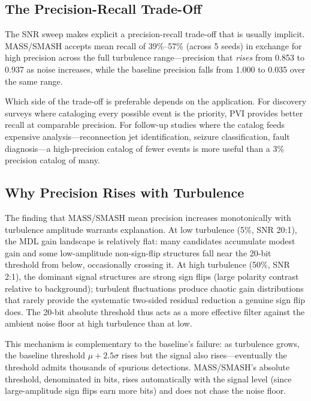 \documentclass[12pt,letterpaper]{article}
\begin{document}
\subsection{The Precision-Recall Trade-Off}

The SNR sweep makes explicit a precision-recall trade-off that is usually
implicit.
MASS/SMASH accepts mean recall of 39\%--57\% (across 5 seeds) in exchange for
high precision across the full turbulence range---precision that
\emph{rises} from 0.853 to 0.937 as noise increases, while the baseline
precision falls from 1.000 to 0.035 over the same range.

Which side of the trade-off is preferable depends on the application.
For discovery surveys where cataloging every possible event is the priority,
PVI provides better recall at comparable precision.
For follow-up studies where the catalog feeds expensive analysis---reconnection
jet identification, seizure classification, fault diagnosis---a high-precision
catalog of fewer events is more useful than a 3\% precision catalog of many.

\subsection{Why Precision Rises with Turbulence}

The finding that MASS/SMASH mean precision increases monotonically with
turbulence amplitude warrants explanation.
At low turbulence (5\%, SNR 20:1), the MDL gain landscape is relatively flat:
many candidates accumulate modest gain and some low-amplitude non-sign-flip
structures fall near the 20-bit threshold from below, occasionally crossing
it.
At high turbulence (50\%, SNR 2:1), the dominant signal structures are strong
sign flips (large polarity contrast relative to background); turbulent
fluctuations produce chaotic gain distributions that rarely provide the
systematic two-sided residual reduction a genuine sign flip does.
The 20-bit absolute threshold thus acts as a more effective filter against the
ambient noise floor at high turbulence than at low.

This mechanism is complementary to the baseline's failure: as turbulence
grows, the baseline threshold $\mu + 2.5\sigma$ rises but the signal also
rises---eventually the threshold admits thousands of spurious detections.
MASS/SMASH's absolute threshold, denominated in bits, rises automatically with
the signal level (since large-amplitude sign flips earn more bits) and does
not chase the noise floor.
\end{document}
